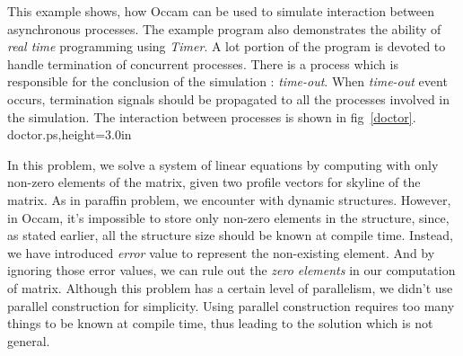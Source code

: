 
This example shows, how Occam can be used to simulate interaction between
asynchronous processes.
The example program also
demonstrates the ability of {\em real time} programming
using {\em Timer}.  A lot portion of the program is
devoted to handle termination of concurrent processes.  There is a
process which is responsible for the conclusion of the simulation :
{\em time-out}.  When {\em time-out} event occurs, termination signals
should be propagated to all the processes involved in the simulation. 
The interaction between processes is shown
in fig~\ref{doctor}.
{doctor.ps,height=3.0in}
\begin{lin}

\end{lin}


In this problem, we solve a system of linear equations by computing with
only non-zero elements of the matrix, given two profile vectors for skyline
of the matrix.  As in paraffin problem, we encounter with dynamic structures.
However, in Occam, it's impossible to store only non-zero elements
in the structure, since, as stated earlier, all the structure size should be
known at compile time.  Instead, we have introduced {\em error} value to
represent the non-existing element.  And by ignoring those error values, we
can rule out the {\em zero elements} in our computation of matrix.
Although this problem has a certain level of parallelism, we didn't use
parallel construction for simplicity. Using parallel construction
requires too many things to be known at compile time, thus leading to the
solution which is not general. 
\begin{lin}

\end{lin}

\newpage
{}


